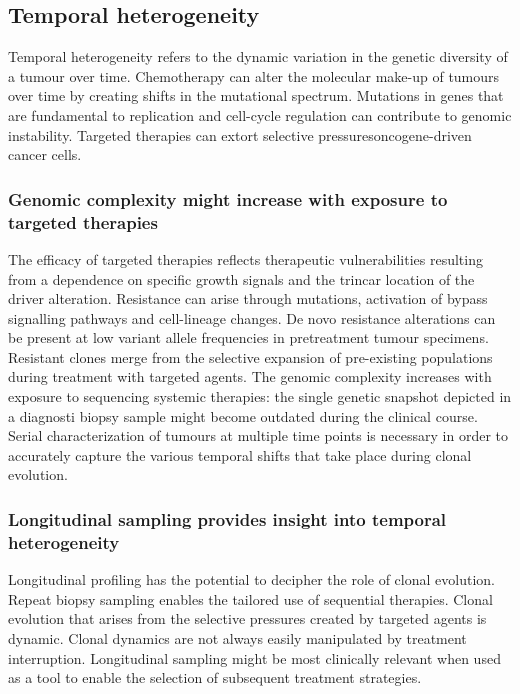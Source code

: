 	\subsection{Temporal heterogeneity}
	Temporal heterogeneity refers to the dynamic variation in the genetic diversity of a tumour over time.
	Chemotherapy can alter the molecular make-up of tumours over time by creating shifts in the mutational spectrum.
	Mutations in genes that are fundamental to replication and cell-cycle regulation can contribute to genomic instability.
	Targeted therapies can extort selective pressuresoncogene-driven cancer cells.

		\subsubsection{Genomic complexity might increase with exposure to targeted therapies}
		The efficacy of targeted therapies reflects therapeutic vulnerabilities resulting from a dependence on specific growth signals and the trincar location of the driver alteration.
		Resistance can arise through mutations, activation of bypass signalling pathways and cell-lineage changes.
		De novo resistance alterations can be present at low variant allele frequencies in pretreatment tumour specimens.
		Resistant clones merge from the selective expansion of pre-existing populations during treatment with targeted agents.
		The genomic complexity increases with exposure to sequencing systemic therapies: the single genetic snapshot depicted in a diagnosti biopsy sample might become outdated during the clinical course.
		Serial characterization of tumours at multiple time points is necessary in order to accurately capture the various temporal shifts that take place during clonal evolution.

		\subsubsection{Longitudinal sampling provides insight into temporal heterogeneity}
		Longitudinal profiling has the potential to decipher the role of clonal evolution.
		Repeat biopsy sampling enables the tailored use of sequential therapies.
		Clonal evolution that arises from the selective pressures created by targeted agents is dynamic.
		Clonal dynamics are not always easily manipulated by treatment interruption.
		Longitudinal sampling might be most clinically relevant when used as a tool to enable the selection of subsequent treatment strategies.

